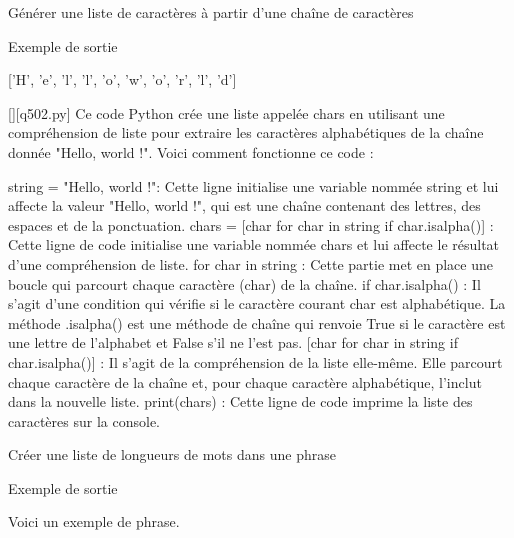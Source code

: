         \question
        Générer une liste de caractères à partir d'une chaîne de caractères

Exemple de sortie

['H', 'e', 'l', 'l', 'o', 'w', 'o', 'r', 'l', 'd']
        \par
        \begin{solution}
            \renewcommand{\nomfichier}{q502.py}
            \pythonfile{\chemincode \nomfichier}[][\nomfichier]
            Ce code Python crée une liste appelée chars en utilisant une compréhension de liste pour extraire les caractères alphabétiques de la chaîne donnée "Hello, world !". Voici comment fonctionne ce code :

    string = "Hello, world !": Cette ligne initialise une variable nommée string et lui affecte la valeur "Hello, world !", qui est une chaîne contenant des lettres, des espaces et de la ponctuation.
    chars = [char for char in string if char.isalpha()] : Cette ligne de code initialise une variable nommée chars et lui affecte le résultat d'une compréhension de liste.
        for char in string : Cette partie met en place une boucle qui parcourt chaque caractère (char) de la chaîne.
        if char.isalpha() : Il s'agit d'une condition qui vérifie si le caractère courant char est alphabétique. La méthode .isalpha() est une méthode de chaîne qui renvoie True si le caractère est une lettre de l'alphabet et False s'il ne l'est pas.
        [char for char in string if char.isalpha()] : Il s'agit de la compréhension de la liste elle-même. Elle parcourt chaque caractère de la chaîne et, pour chaque caractère alphabétique, l'inclut dans la nouvelle liste.
    print(chars) : Cette ligne de code imprime la liste des caractères sur la console.
        \end{solution}
        

        \question
        Créer une liste de longueurs de mots dans une phrase

Exemple de sortie

Voici un exemple de phrase.

